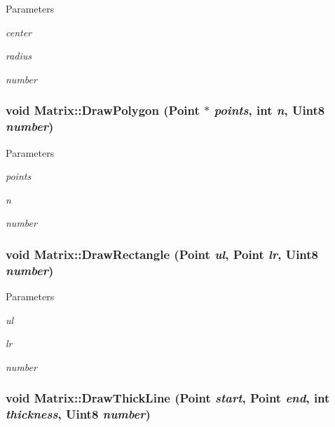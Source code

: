 \begin{DoxyParams}{Parameters}
\item[{\em center}]\item[{\em radius}]\item[{\em number}]\end{DoxyParams}
\hypertarget{classMatrix_a3b2f9c59a4cc8da933de12f4ccb867f6}{
\subsubsection[{DrawPolygon}]{\setlength{\rightskip}{0pt plus 5cm}void Matrix::DrawPolygon ({\bf Point} $\ast$ {\em points}, \/  int {\em n}, \/  Uint8 {\em number})}}
\label{classMatrix_a3b2f9c59a4cc8da933de12f4ccb867f6}

\begin{DoxyParams}{Parameters}
\item[{\em points}]\item[{\em n}]\item[{\em number}]\end{DoxyParams}
\hypertarget{classMatrix_a55977ba3ee91f352759f446a5092ea23}{
\subsubsection[{DrawRectangle}]{\setlength{\rightskip}{0pt plus 5cm}void Matrix::DrawRectangle ({\bf Point} {\em ul}, \/  {\bf Point} {\em lr}, \/  Uint8 {\em number})}}
\label{classMatrix_a55977ba3ee91f352759f446a5092ea23}

\begin{DoxyParams}{Parameters}
\item[{\em ul}]\item[{\em lr}]\item[{\em number}]\end{DoxyParams}
\hypertarget{classMatrix_a8aecf2d42e65b27f051c8af79aeeb467}{
\subsubsection[{DrawThickLine}]{\setlength{\rightskip}{0pt plus 5cm}void Matrix::DrawThickLine ({\bf Point} {\em start}, \/  {\bf Point} {\em end}, \/  int {\em thickness}, \/  Uint8 {\em number})}}
\label{classMatrix_a8aecf2d42e65b27f051c8af79aeeb467}

